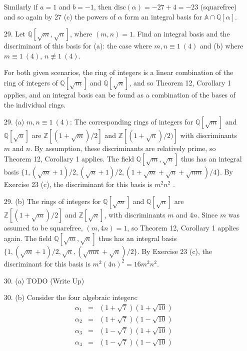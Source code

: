\documentclass{article}
\newcommand{\Q}[0]{\mathbb{Q}}
\newcommand{\Z}[0]{\mathbb{Z}}
\newcommand{\disc}[1]{\text{disc}(#1)}
\begin{document}
\begin{enumerate}
Similarly if $a = 1$ and $b = -1$, then $\disc{\alpha} = -27 + 4 = -23$ (squarefree) and so again by 27 (c) the powers of $\alpha$ form an integral basis for $\mathbb{A} \cap \Q[\alpha]$.

\item[29.] Let $\Q[\sqrt{m}, \sqrt{n}]$, where $(m, n) = 1$.  Find an integral basis and the discriminant of this basis for (a): the case where $m, n \equiv 1\ (4)$ and (b) where $m \equiv 1\ (4)$, $n \not\equiv 1\ (4)$.

For both given scenarios, the ring of integers is a linear combination of the ring of integers of $\Q[\sqrt{m}]$ and $\Q[\sqrt{n}]$, and so Theorem 12, Corollary 1 applies, and an integral basis can be found as a combination of the bases of the individual rings.

\item [29. (a)] $m, n \equiv 1\ (4)$: The corresponding rings of integers for $\Q[\sqrt{m}]$ and $\Q[\sqrt{n}]$ are $\Z[(1 + \sqrt{m})/2]$ and $\Z[(1 + \sqrt{n})/2)]$ with discriminants $m$ and $n$.  By assumption, these discriminants are relatively prime, so Theorem 12, Corollary 1 applies.  The field $\Q[\sqrt{m}, \sqrt{n}]$ thus has an integral basis $\{ 1, (\sqrt{m} + 1)/2, (\sqrt{n} + 1)/2, (1 + \sqrt{m} + \sqrt{n} + \sqrt{nm})/4 \}$.  By Exercise 23 (c), the discriminant for this basis is $m^2 n^2$ .

\item [29. (b)] The rings of integers for $\Q[\sqrt{m}]$ and $\Q[\sqrt{n}]$ are $\Z[(1 +\sqrt{m})/2]$ and $\Z[\sqrt{n}]$, with discriminants $m$ and $4n$.  Since $m$ was assumed to be squarefree, $(m, 4n) = 1$, so Theorem 12, Corollary 1 applies again.  The field $\Q[\sqrt{m}, \sqrt{n}]$ thus has an integral basis $\{ 1, (\sqrt{m} + 1)/2, \sqrt{n}, (\sqrt{mn} + \sqrt{n})/2 \}$.  By Exercise 23 (c), the discriminant for this basis is $m^2 (4n)^2 = 16m^2 n^2$.

\item[30. (a)] TODO (Write Up)

\item[30. (b)] Consider the four algebraic integers:
\begin{eqnarray*}
    \alpha_1 &=& (1 + \sqrt{7})(1 + \sqrt{10}) \\
    \alpha_2 &=& (1 + \sqrt{7})(1 - \sqrt{10}) \\
    \alpha_3 &=& (1 - \sqrt{7})(1 + \sqrt{10}) \\
    \alpha_4 &=& (1 - \sqrt{7})(1 - \sqrt{10}) \\
\end{eqnarray*}


\end{enumerate}
\end{document}
